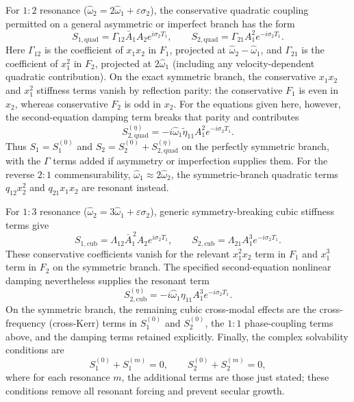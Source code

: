 \documentclass[11pt]{article}
\begin{document}
For $1{:}2$ resonance ($\hat\omega_2=2\hat\omega_1+\varepsilon\sigma_2$), the conservative quadratic coupling permitted on a general asymmetric or imperfect branch has the form
\[
S_{1,\mathrm{quad}}=\Gamma_{12}\bar A_1A_2e^{i\sigma_2T_1},\qquad
S_{2,\mathrm{quad}}=\Gamma_{21}A_1^2e^{-i\sigma_2T_1}.
\]
Here $\Gamma_{12}$ is the coefficient of $x_1x_2$ in $F_1$, projected at $\hat\omega_2-\hat\omega_1$, and $\Gamma_{21}$ is the coefficient of $x_1^2$ in $F_2$, projected at $2\hat\omega_1$ (including any velocity-dependent quadratic contribution). On the exact symmetric branch, the conservative $x_1x_2$ and $x_1^2$ stiffness terms vanish by reflection parity: the conservative $F_1$ is even in $x_2$, whereas conservative $F_2$ is odd in $x_2$. For the equations given here, however, the second-equation damping term breaks that parity and contributes
\[
S_{2,\mathrm{quad}}^{(\eta)}=-i\hat\omega_1\widetilde\eta_{11}A_1^2e^{-i\sigma_2T_1}.
\]
Thus $S_1=S_1^{(0)}$ and $S_2=S_2^{(0)}+S_{2,\mathrm{quad}}^{(\eta)}$ on the perfectly symmetric branch, with the $\Gamma$ terms added if asymmetry or imperfection supplies them. For the reverse $2{:}1$ commensurability, $\hat\omega_1\approx2\hat\omega_2$, the symmetric-branch quadratic terms $q_{12}x_2^2$ and $q_{21}x_1x_2$ are resonant instead.

For $1{:}3$ resonance ($\hat\omega_2=3\hat\omega_1+\varepsilon\sigma_2$), generic symmetry-breaking cubic stiffness terms give
\[
S_{1,\mathrm{cub}}=\Lambda_{12}\bar A_1^{\,2}A_2e^{i\sigma_2T_1},\qquad
S_{2,\mathrm{cub}}=\Lambda_{21}A_1^3e^{-i\sigma_2T_1}.
\]
These conservative coefficients vanish for the relevant $x_1^2x_2$ term in $F_1$ and $x_1^3$ term in $F_2$ on the symmetric branch. The specified second-equation nonlinear damping nevertheless supplies the resonant term
\[
S_{2,\mathrm{cub}}^{(\eta)}=-i\hat\omega_1\eta_{11}A_1^3e^{-i\sigma_2T_1}.
\]
On the symmetric branch, the remaining cubic cross-modal effects are the cross-frequency (cross-Kerr) terms in $S_1^{(0)}$ and $S_2^{(0)}$, the $1{:}1$ phase-coupling terms above, and the damping terms retained explicitly. Finally, the complex solvability conditions are
\begin{equation}\label{eq:solvability}
S_1^{(0)}+S_1^{(m)}=0,\qquad S_2^{(0)}+S_2^{(m)}=0,
\end{equation}
where for each resonance $m$, the additional terms are those just stated; these conditions remove all resonant forcing and prevent secular growth.
\end{document}
